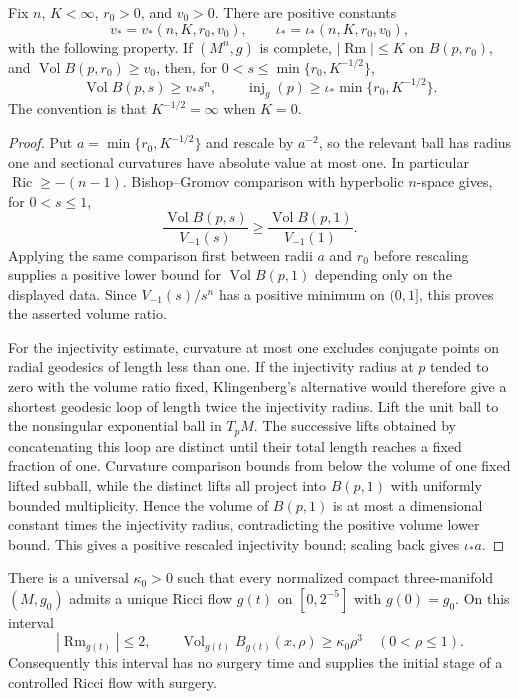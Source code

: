 \begin{theorem}
\label{thm:local-volume-injectivity-radius-control}
\notready
Fix $n$, $K<\infty$, $r_0>0$, and $v_0>0$.  There are positive constants
\[
 v_*=v_*(n,K,r_0,v_0),
 \qquad \iota_*=\iota_*(n,K,r_0,v_0),
\]
with the following property.  If $(M^n,g)$ is complete,
$|\operatorname{Rm}|\le K$ on $B(p,r_0)$, and
$\operatorname{Vol}B(p,r_0)\ge v_0$, then, for
$0<s\le\min\{r_0,K^{-1/2}\}$,
\[
 \operatorname{Vol}B(p,s)\ge v_*s^n,
 \qquad
 \operatorname{inj}_g(p)\ge
 \iota_*\min\{r_0,K^{-1/2}\}.
\]
The convention is that $K^{-1/2}=\infty$ when $K=0$.
\end{theorem}

\begin{proof}
Put $a=\min\{r_0,K^{-1/2}\}$ and rescale by $a^{-2}$, so the relevant
ball has radius one and sectional curvatures have absolute value at most one.
In particular $\operatorname{Ric}\ge-(n-1)$.  Bishop--Gromov comparison with
hyperbolic $n$-space gives, for $0<s\le1$,
\[
 \frac{\operatorname{Vol}B(p,s)}{V_{-1}(s)}
 \ge
 \frac{\operatorname{Vol}B(p,1)}{V_{-1}(1)}.
\]
Applying the same comparison first between radii $a$ and $r_0$ before
rescaling supplies a positive lower bound for
$\operatorname{Vol}B(p,1)$ depending only on the displayed data.  Since
$V_{-1}(s)/s^n$ has a positive minimum on $(0,1]$, this proves the asserted
volume ratio.

For the injectivity estimate, curvature at most one excludes conjugate points
on radial geodesics of length less than one.  If the injectivity radius at
$p$ tended to zero with the volume ratio fixed, Klingenberg's alternative
would therefore give a shortest geodesic loop of length twice the injectivity
radius.  Lift the unit ball to the nonsingular exponential ball in $T_pM$.
The successive lifts obtained by concatenating this loop are distinct until
their total length reaches a fixed fraction of one.  Curvature comparison
bounds from below the volume of one fixed lifted subball, while the distinct
lifts all project into $B(p,1)$ with uniformly bounded multiplicity.  Hence
the volume of $B(p,1)$ is at most a dimensional constant times the
injectivity radius, contradicting the positive volume lower bound.  This
gives a positive rescaled injectivity bound; scaling back gives $\iota_*a$.
\end{proof}

\begin{theorem}
\label{thm:normalized-short-time-ricci-flow}
\notready
There is a universal $\kappa_0>0$ such that every normalized compact
three-manifold $(M,g_0)$ admits a unique Ricci flow $g(t)$ on
$[0,2^{-5}]$ with $g(0)=g_0$.  On this interval
\[
 |\operatorname{Rm}_{g(t)}|\le2,
 \qquad
 \operatorname{Vol}_{g(t)}B_{g(t)}(x,\rho)\ge\kappa_0\rho^3
 \quad(0<\rho\le1).
\]
Consequently this interval has no surgery time and supplies the initial
stage of a controlled Ricci flow with surgery.
\end{theorem}

